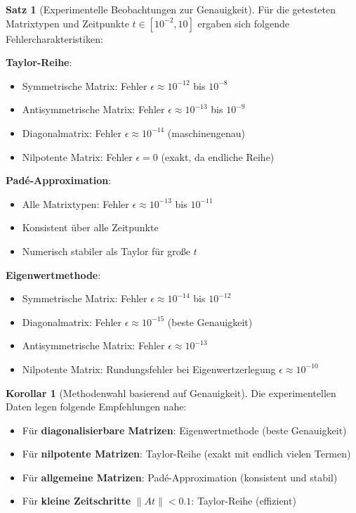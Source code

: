\documentclass[a4paper,12pt]{report}
\theoremstyle{definition}
\newtheorem{satz}{Satz}
\newtheorem{korollar}{Korollar}
\begin{document}
	\begin{satz}[Experimentelle Beobachtungen zur Genauigkeit]
		Für die getesteten Matrixtypen und Zeitpunkte $t \in [10^{-2}, 10]$ ergaben sich folgende Fehlercharakteristiken:
		
		\textbf{Taylor-Reihe}:
		\begin{itemize}
			\item Symmetrische Matrix: Fehler $\epsilon \approx 10^{-12}$ bis $10^{-8}$
			\item Antisymmetrische Matrix: Fehler $\epsilon \approx 10^{-13}$ bis $10^{-9}$
			\item Diagonalmatrix: Fehler $\epsilon \approx 10^{-14}$ (maschinengenau)
			\item Nilpotente Matrix: Fehler $\epsilon = 0$ (exakt, da endliche Reihe)
		\end{itemize}
		
		\textbf{Padé-Approximation}:
		\begin{itemize}
			\item Alle Matrixtypen: Fehler $\epsilon \approx 10^{-13}$ bis $10^{-11}$
			\item Konsistent über alle Zeitpunkte
			\item Numerisch stabiler als Taylor für große $t$
		\end{itemize}
		
		\textbf{Eigenwertmethode}:
		\begin{itemize}
			\item Symmetrische Matrix: Fehler $\epsilon \approx 10^{-14}$ bis $10^{-12}$
			\item Diagonalmatrix: Fehler $\epsilon \approx 10^{-15}$ (beste Genauigkeit)
			\item Antisymmetrische Matrix: Fehler $\epsilon \approx 10^{-13}$
			\item Nilpotente Matrix: Rundungsfehler bei Eigenwertzerlegung $\epsilon \approx 10^{-10}$
		\end{itemize}
	\end{satz}
	
	\begin{korollar}[Methodenwahl basierend auf Genauigkeit]
		Die experimentellen Daten legen folgende Empfehlungen nahe:
		\begin{itemize}
			\item Für \textbf{diagonalisierbare Matrizen}: Eigenwertmethode (beste Genauigkeit)
			\item Für \textbf{nilpotente Matrizen}: Taylor-Reihe (exakt mit endlich vielen Termen)
			\item Für \textbf{allgemeine Matrizen}: Padé-Approximation (konsistent und stabil)
			\item Für \textbf{kleine Zeitschritte} $\|At\| < 0.1$: Taylor-Reihe (effizient)
		\end{itemize}
	\end{korollar}
	
\end{document}
